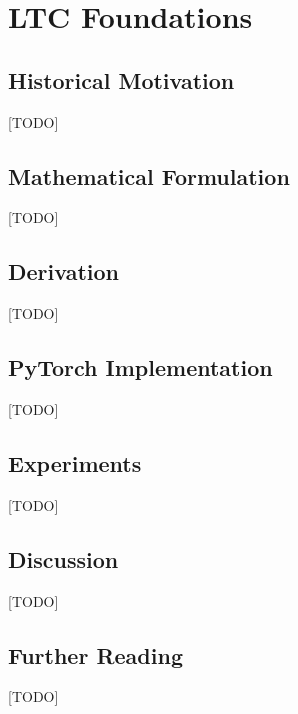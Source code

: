 
\chapter{LTC Foundations}
\label{ch:07_ltc_foundations}


\section{Historical Motivation}
[TODO]

\section{Mathematical Formulation}
[TODO]

\section{Derivation}
[TODO]

\section{PyTorch Implementation}
[TODO]

\section{Experiments}
[TODO]

\section{Discussion}
[TODO]

\section{Further Reading}
[TODO]
